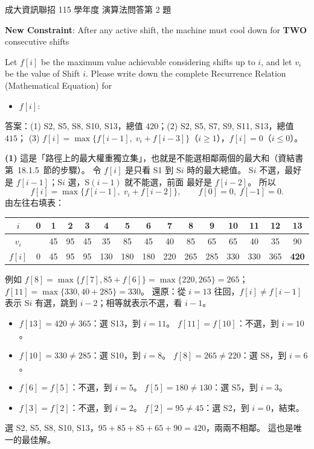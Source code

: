 \begin{pastexam}[label={px:ncku-115-prog-15}]{成大資訊聯招 115 學年度 演算法問答第 2 題}
\begin{enumerate}[label=(\arabic*)]
\hspace*{1em}\textbf{New Constraint}: After any active shift, the machine must cool down for
\textbf{TWO} consecutive shifts

Let $f[i]$ be the maximum value achievable considering shifts up to $i$, and let $v_i$ be the value of
Shift $i$. Please write down the complete Recurrence Relation (Mathematical Equation) for
\begin{itemize}\item $f[i]$: \underline{\hspace{8cm}}\end{itemize}
\end{enumerate}
\end{pastexam}

\begin{pastsoln}
答案：(1) S2, S5, S8, S10, S13，總值 $420$；(2) S2, S5, S7, S9, S11, S13，總值 $415$；
(3) $f[i] = \max\{f[i-1],\; v_i + f[i-3]\}$（$i \ge 1$），$f[i] = 0$（$i \le 0$）。

\textbf{(1)} 這是「路徑上的最大權重獨立集」，也就是不能選相鄰兩個的最大和（資結書第~18.1.5~節的步驟）。
令 $f[i]$ 是只看 S1 到 S$i$ 時的最大總值。 S$i$ 不選，最好是 $f[i-1]$；S$i$ 選，S$(i-1)$ 就不能選，前面
最好是 $f[i-2]$。 所以
\[
f[i] = \max\{f[i-1],\; v_i + f[i-2]\}, \qquad f[0] = 0,\; f[-1] = 0 .
\]
由左往右填表：
\begin{center}
\small
\setlength{\tabcolsep}{3.5pt}
\begin{tabular}{c|cccccccccccccc}
$i$ & 0 & 1 & 2 & 3 & 4 & 5 & 6 & 7 & 8 & 9 & 10 & 11 & 12 & 13 \\ \hline
$v_i$ & & 45 & 95 & 45 & 35 & 85 & 45 & 40 & 85 & 65 & 65 & 40 & 35 & 90 \\
$f[i]$ & 0 & 45 & 95 & 95 & 130 & 180 & 180 & 220 & 265 & 285 & 330 & 330 & 365 & \textbf{420} \\
\end{tabular}
\end{center}
例如 $f[8] = \max\{f[7], 85 + f[6]\} = \max\{220, 265\} = 265$；$f[11] = \max\{330, 40 + 285\} = 330$。
還原：從 $i = 13$ 往回，$f[i] \ne f[i-1]$ 表示 S$i$ 有選，跳到 $i - 2$；相等就表示不選，看 $i - 1$。
\begin{itemize}
\item $f[13] = 420 \ne 365$：選 S13，到 $i = 11$。 $f[11] = f[10]$：不選，到 $i = 10$。
\item $f[10] = 330 \ne 285$：選 S10，到 $i = 8$。 $f[8] = 265 \ne 220$：選 S8，到 $i = 6$。
\item $f[6] = f[5]$：不選，到 $i = 5$。 $f[5] = 180 \ne 130$：選 S5，到 $i = 3$。
\item $f[3] = f[2]$：不選，到 $i = 2$。 $f[2] = 95 \ne 45$：選 S2，到 $i = 0$，結束。
\end{itemize}
選 S2, S5, S8, S10, S13，$95 + 85 + 85 + 65 + 90 = 420$，兩兩不相鄰。 這也是唯一的最佳解。


\end{pastsoln}
